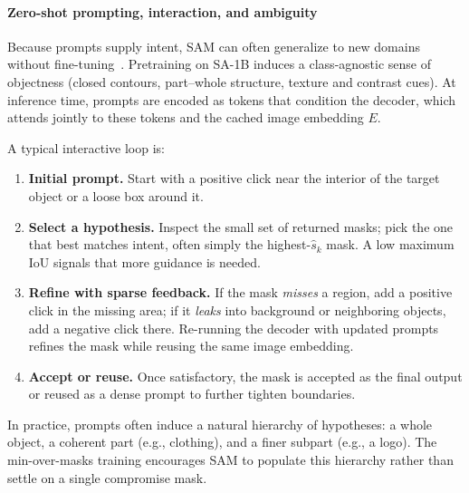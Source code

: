 \begin{enrichment}
\begin{enrichment}
		\paragraph{Zero-shot prompting, interaction, and ambiguity}
		Because prompts supply intent, SAM can often generalize to new domains without fine-tuning~\cite{kirillov2023_sam}. Pretraining on SA-1B induces a class-agnostic sense of objectness (closed contours, part--whole structure, texture and contrast cues). At inference time, prompts are encoded as tokens that condition the decoder, which attends jointly to these tokens and the cached image embedding \(E\).
		
		A typical interactive loop is:
		\begin{enumerate}
			\item \textbf{Initial prompt.} Start with a positive click near the interior of the target object or a loose box around it.
			\item \textbf{Select a hypothesis.} Inspect the small set of returned masks; pick the one that best matches intent, often simply the highest-\(\hat{s}_k\) mask. A low maximum IoU signals that more guidance is needed.
			\item \textbf{Refine with sparse feedback.} If the mask \emph{misses} a region, add a positive click in the missing area; if it \emph{leaks} into background or neighboring objects, add a negative click there. Re-running the decoder with updated prompts refines the mask while reusing the same image embedding.
			\item \textbf{Accept or reuse.} Once satisfactory, the mask is accepted as the final output or reused as a dense prompt to further tighten boundaries.
		\end{enumerate}
		In practice, prompts often induce a natural hierarchy of hypotheses: a whole object, a coherent part (e.g., clothing), and a finer subpart (e.g., a logo). The min-over-masks training encourages SAM to populate this hierarchy rather than settle on a single compromise mask.
		

\end{enrichment}
\end{enrichment}
